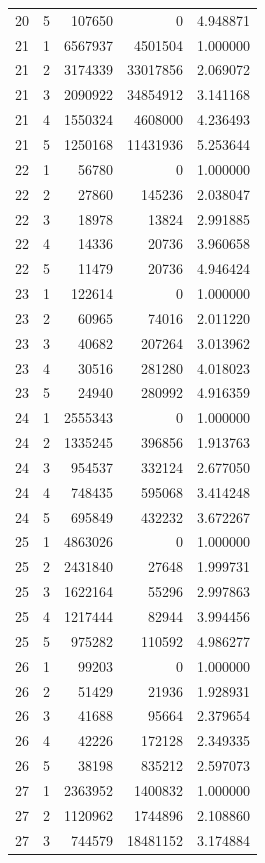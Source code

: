 \begin{longtable}{rrrrr}
20 & 5 & 107650 & 0 & 4.948871 \\
21 & 1 & 6567937 & 4501504 & 1.000000 \\
21 & 2 & 3174339 & 33017856 & 2.069072 \\
21 & 3 & 2090922 & 34854912 & 3.141168 \\
21 & 4 & 1550324 & 4608000 & 4.236493 \\
21 & 5 & 1250168 & 11431936 & 5.253644 \\
22 & 1 & 56780 & 0 & 1.000000 \\
22 & 2 & 27860 & 145236 & 2.038047 \\
22 & 3 & 18978 & 13824 & 2.991885 \\
22 & 4 & 14336 & 20736 & 3.960658 \\
22 & 5 & 11479 & 20736 & 4.946424 \\
23 & 1 & 122614 & 0 & 1.000000 \\
23 & 2 & 60965 & 74016 & 2.011220 \\
23 & 3 & 40682 & 207264 & 3.013962 \\
23 & 4 & 30516 & 281280 & 4.018023 \\
23 & 5 & 24940 & 280992 & 4.916359 \\
24 & 1 & 2555343 & 0 & 1.000000 \\
24 & 2 & 1335245 & 396856 & 1.913763 \\
24 & 3 & 954537 & 332124 & 2.677050 \\
24 & 4 & 748435 & 595068 & 3.414248 \\
24 & 5 & 695849 & 432232 & 3.672267 \\
25 & 1 & 4863026 & 0 & 1.000000 \\
25 & 2 & 2431840 & 27648 & 1.999731 \\
25 & 3 & 1622164 & 55296 & 2.997863 \\
25 & 4 & 1217444 & 82944 & 3.994456 \\
25 & 5 & 975282 & 110592 & 4.986277 \\
26 & 1 & 99203 & 0 & 1.000000 \\
26 & 2 & 51429 & 21936 & 1.928931 \\
26 & 3 & 41688 & 95664 & 2.379654 \\
26 & 4 & 42226 & 172128 & 2.349335 \\
26 & 5 & 38198 & 835212 & 2.597073 \\
27 & 1 & 2363952 & 1400832 & 1.000000 \\
27 & 2 & 1120962 & 1744896 & 2.108860 \\
27 & 3 & 744579 & 18481152 & 3.174884 \\

\end{longtable}
